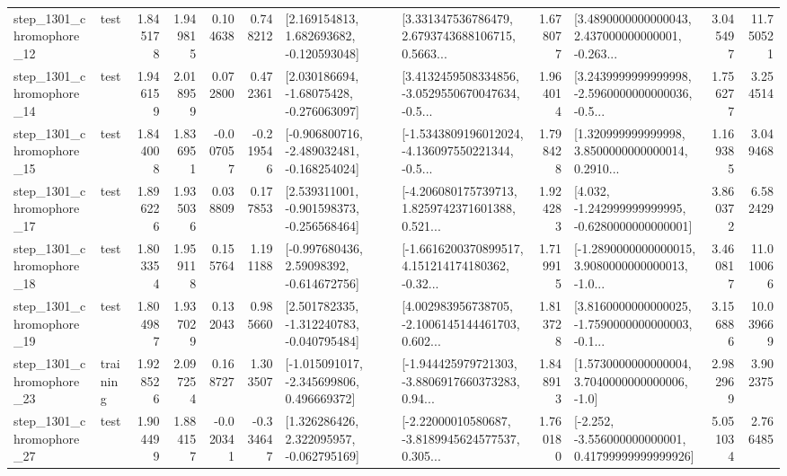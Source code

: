 \begin{tabular}{llrrrrllrlrr}
 step\_1301\_chromophore\_12 &      test &      1.845178 &    1.949815 &      0.104638 &  0.748212 &    [2.169154813, 1.682693682, -0.120593048] &  [3.331347536786479, 2.6793743688106715, 0.5663... &       1.678077 &  [3.4890000000000043, 2.437000000000001, -0.263... &            3.045497 &         11.750521 \\
 step\_1301\_chromophore\_14 &      test &      1.946159 &    2.018959 &      0.072800 &  0.472361 &    [2.030186694, -1.68075428, -0.276063097] &  [3.4132459508334856, -3.0529550670047634, -0.5... &       1.964014 &  [3.2439999999999998, -2.5960000000000036, -0.5... &            1.756277 &          3.254514 \\
 step\_1301\_chromophore\_15 &      test &      1.844008 &    1.836951 &     -0.007057 & -0.219546 &  [-0.906800716, -2.489032481, -0.168254024] &  [-1.5343809196012024, -4.136097550221344, -0.5... &       1.798428 &  [1.320999999999998, 3.8500000000000014, 0.2910... &            1.169385 &          3.049468 \\
 step\_1301\_chromophore\_17 &      test &      1.896226 &    1.935036 &      0.038809 &  0.177853 &   [2.539311001, -0.901598373, -0.256568464] &  [-4.206080175739713, 1.8259742371601388, 0.521... &       1.924283 &   [4.032, -1.242999999999995, -0.6280000000000001] &            3.860372 &          6.582429 \\
 step\_1301\_chromophore\_18 &      test &      1.803354 &    1.959118 &      0.155764 &  1.191188 &    [-0.997680436, 2.59098392, -0.614672756] &  [-1.6616200370899517, 4.151214174180362, -0.32... &       1.719915 &  [-1.2890000000000015, 3.9080000000000013, -1.0... &            3.460817 &         11.010066 \\
 step\_1301\_chromophore\_19 &      test &      1.804987 &    1.937029 &      0.132043 &  0.985660 &   [2.501782335, -1.312240783, -0.040795484] &  [4.002983956738705, -2.1006145144461703, 0.602... &       1.813728 &  [3.8160000000000025, -1.7590000000000003, -0.1... &            3.156886 &         10.039669 \\
 step\_1301\_chromophore\_23 &  training &      1.928526 &    2.097254 &      0.168727 &  1.303507 &   [-1.015091017, -2.345699806, 0.496669372] &  [-1.944425979721303, -3.8806917660373283, 0.94... &       1.848913 &     [1.5730000000000004, 3.7040000000000006, -1.0] &            2.982969 &          3.902375 \\
 step\_1301\_chromophore\_27 &      test &      1.904499 &    1.884157 &     -0.020341 & -0.334647 &    [1.326286426, 2.322095957, -0.062795169] &  [-2.22000010580687, -3.8189945624577537, 0.305... &       1.760180 &  [-2.252, -3.556000000000001, 0.41799999999999926] &            5.051034 &          2.766485 \\

\end{tabular}
